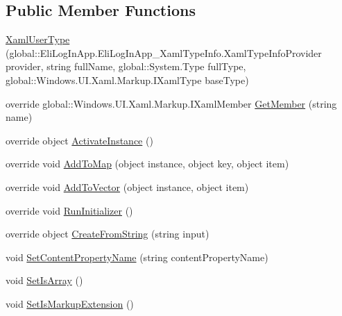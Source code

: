 \subsection*{Public Member Functions}
\begin{DoxyCompactItemize}
\item 
\hyperlink{class_eli_log_in_app_1_1_eli_log_in_app___xaml_type_info_1_1_xaml_user_type_aead17ccf55a45757a3f89915c58ff296}{Xaml\+User\+Type} (global\+::\+Eli\+Log\+In\+App.\+Eli\+Log\+In\+App\+\_\+\+Xaml\+Type\+Info.\+Xaml\+Type\+Info\+Provider provider, string full\+Name, global\+::\+System.\+Type full\+Type, global\+::\+Windows.\+U\+I.\+Xaml.\+Markup.\+I\+Xaml\+Type base\+Type)
\item 
override global\+::\+Windows.\+U\+I.\+Xaml.\+Markup.\+I\+Xaml\+Member \hyperlink{class_eli_log_in_app_1_1_eli_log_in_app___xaml_type_info_1_1_xaml_user_type_ace8732f899047742b6d12a0266060652}{Get\+Member} (string name)
\item 
override object \hyperlink{class_eli_log_in_app_1_1_eli_log_in_app___xaml_type_info_1_1_xaml_user_type_a318677d00a320935c3ecf51ec8b0425d}{Activate\+Instance} ()
\item 
override void \hyperlink{class_eli_log_in_app_1_1_eli_log_in_app___xaml_type_info_1_1_xaml_user_type_a39e9eebc47fc7506686650e59ce7d956}{Add\+To\+Map} (object instance, object key, object item)
\item 
override void \hyperlink{class_eli_log_in_app_1_1_eli_log_in_app___xaml_type_info_1_1_xaml_user_type_ad2a78d104d13536ed77b5d74c52d21af}{Add\+To\+Vector} (object instance, object item)
\item 
override void \hyperlink{class_eli_log_in_app_1_1_eli_log_in_app___xaml_type_info_1_1_xaml_user_type_ae66b79ba8e704f9f662faa257e17fe7e}{Run\+Initializer} ()
\item 
override object \hyperlink{class_eli_log_in_app_1_1_eli_log_in_app___xaml_type_info_1_1_xaml_user_type_a2ca01ffd5253dcc80ff2fbeb81509bbe}{Create\+From\+String} (string input)
\item 
void \hyperlink{class_eli_log_in_app_1_1_eli_log_in_app___xaml_type_info_1_1_xaml_user_type_adff0109146860359f64270e126c7ff45}{Set\+Content\+Property\+Name} (string content\+Property\+Name)
\item 
void \hyperlink{class_eli_log_in_app_1_1_eli_log_in_app___xaml_type_info_1_1_xaml_user_type_ad15c17048ffacdb0216e1aeb91305f75}{Set\+Is\+Array} ()
\item 
void \hyperlink{class_eli_log_in_app_1_1_eli_log_in_app___xaml_type_info_1_1_xaml_user_type_a5dad4447cab162df2a7f440d1d2b3103}{Set\+Is\+Markup\+Extension} ()

\end{DoxyCompactItemize}
